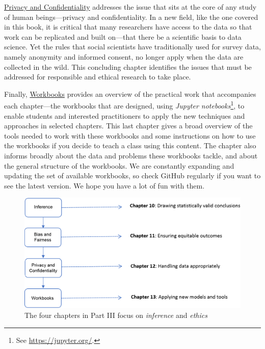\documentclass[]{krantz}
\begin{document}
\protect\hyperlink{chap:privacy}{Privacy and Confidentiality} addresses
the issue that sits at the core of any study of human beings---privacy
and confidentiality. In a new field, like the one covered in this book,
it is critical that many researchers have access to the data so that
work can be replicated and built on---that there be a scientific basis
to data science. Yet the rules that social scientists have traditionally
used for survey data, namely anonymity and informed consent, no longer
apply when the data are collected in the wild. This concluding chapter
identifies the issues that must be addressed for responsible and ethical
research to take place.

Finally, \protect\hyperlink{chap:workbooks}{Workbooks} provides an
overview of the practical work that accompanies each chapter---the
workbooks that are designed, using \emph{Jupyter notebooks}\footnote{See
  \url{https://jupyter.org/}.}, to enable students and interested
practitioners to apply the new techniques and approaches in selected
chapters. This last chapter gives a broad overview of the tools needed
to work with these workbooks and some instructions on how to use the
workbooks if you decide to teach a class using this content. The chapter
also informs broadly about the data and problems these workbooks tackle,
and about the general structure of the workbooks. We are constantly
expanding and updating the set of available workbooks, so check GitHub
regularly if you want to see the latest version. We hope you have a lot
of fun with them.

\begin{figure}

{\centering \includegraphics[width=0.9\linewidth]{ChapterIntro/figures/Figure4_new} 

}

\caption{The four chapters in Part III focus on \textit{inference} and \textit{ethics}}\label{fig:fig5}
\end{figure}
\end{document}
